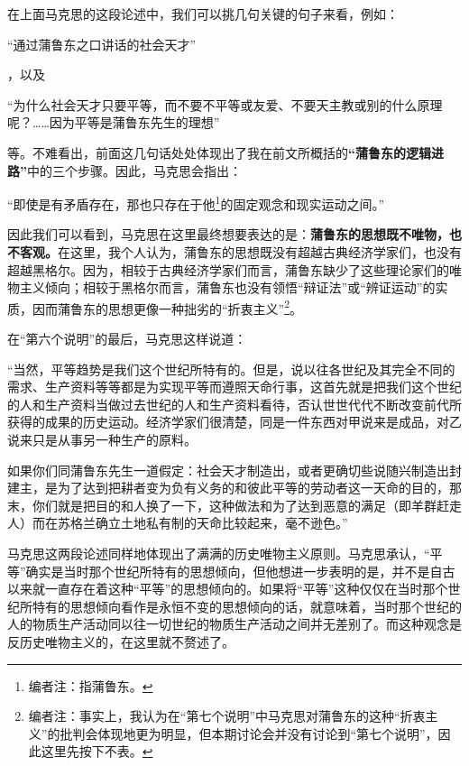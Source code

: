 \documentclass[a4paper,twoside,12pt,AutoFakeBold]{ctexart}
\begin{document}
在上面马克思的这段论述中，我们可以挑几句关键的句子来看，例如：\begin{fangsong}
    “通过蒲鲁东之口讲话的社会天才”
\end{fangsong}，以及\begin{fangsong}
    “为什么社会天才只要平等，而不要不平等或友爱、不要天主教或别的什么原理呢？……因为平等是蒲鲁东先生的理想”
\end{fangsong}
等。不难看出，前面这几句话处处体现出了我在前文所概括的\textbf{“蒲鲁东的逻辑进路”}中的三个步骤。因此，马克思会指出：\begin{fangsong}
    “即使是有矛盾存在，那也只存在于他\footnote{编者注：指蒲鲁东。}的固定观念和现实运动之间。”
\end{fangsong}

因此我们可以看到，马克思在这里最终想要表达的是：\textbf{蒲鲁东的思想既不唯物，也不客观。}在这里，我个人认为，蒲鲁东的思想既没有超越古典经济学家们，也没有超越黑格尔。因为，相较于古典经济学家们而言，蒲鲁东缺少了这些理论家们的唯物主义倾向；相较于黑格尔而言，蒲鲁东也没有领悟“辩证法”或“辨证运动”的实质，因而蒲鲁东的思想更像一种拙劣的“折衷主义”\footnote{编者注：事实上，我认为在“第七个说明”中马克思对蒲鲁东的这种“折衷主义”的批判会体现地更为明显，但本期讨论会并没有讨论到“第七个说明”，因此这里先按下不表。}。

在“第六个说明”的最后，马克思这样说道：
\begin{adjustwidth}{2em}{2em}
    \qquad\fangsong
    “当然，平等趋势是我们这个世纪所特有的。但是，说以往各世纪及其完全不同的需求、生产资料等等都是为实现平等而遵照天命行事，这首先就是把我们这个世纪的人和生产资料当做过去世纪的人和生产资料看待，否认世世代代不断改变前代所获得的成果的历史运动。经济学家们很清楚，同是一件东西对甲说来是成品，对乙说来只是从事另一种生产的原料。
    
    如果你们同蒲鲁东先生一道假定：社会天才制造出，或者更确切些说随兴制造出封建主，是为了达到把耕者变为负有义务的和彼此平等的劳动者这一天命的目的，那末，你们就是把目的和人换了一下，这种做法和为了达到恶意的满足（即羊群赶走人）而在苏格兰确立土地私有制的天命比较起来，毫不逊色。”
\end{adjustwidth}

马克思这两段论述同样地体现出了满满的历史唯物主义原则。马克思承认，“平等”确实是当时那个世纪所特有的思想倾向，但他想进一步表明的是，并不是自古以来就一直存在着这种“平等”的思想倾向的。如果将“平等”这种仅仅在当时那个世纪所特有的思想倾向看作是永恒不变的思想倾向的话，就意味着，当时那个世纪的人的物质生产活动同以往一切世纪的物质生产活动之间并无差别了。而这种观念是反历史唯物主义的，在这里就不赘述了。
\end{document}
